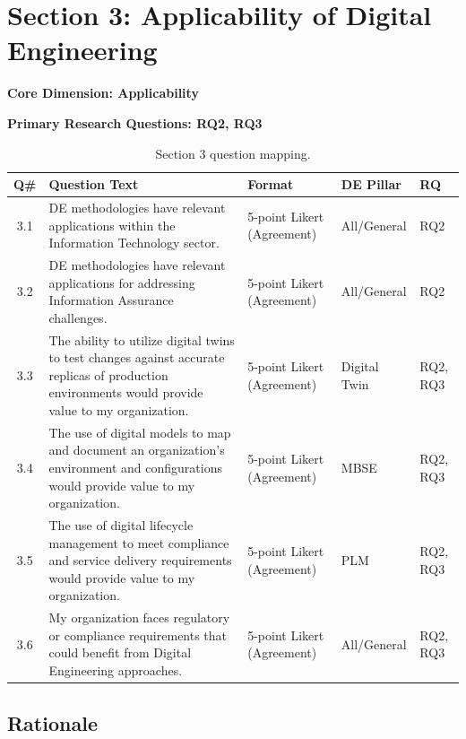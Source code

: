   \section{Section 3: Applicability of Digital Engineering}

  \textbf{Core Dimension: Applicability}

  \textbf{Primary Research Questions: RQ2, RQ3}

  \begin{table}[H]
    \centering
    \caption{Section 3 question mapping.}
    \label{tab:section3-mapping}
    \small
    \begin{tabular}{@{}cp{2.2in}p{0.9in}p{0.8in}l@{}}
      \toprule
      \textbf{Q\#} & \textbf{Question Text} & \textbf{Format} & \textbf{DE Pillar} & \textbf{RQ} \\
      \midrule
      3.1 & DE methodologies have relevant applications within the Information Technology sector. & 5-point Likert (Agreement) & All/General & RQ2 \\
      3.2 & DE methodologies have relevant applications for addressing Information Assurance challenges. & 5-point Likert (Agreement) & All/General & RQ2 \\
      3.3 & The ability to utilize digital twins to test changes against accurate replicas of production environments would provide value to my organization. & 5-point Likert (Agreement) & Digital Twin & RQ2, RQ3 \\
      3.4 & The use of digital models to map and document an organization's environment and configurations would provide value to my organization. & 5-point Likert (Agreement) & MBSE & RQ2, RQ3 \\
      3.5 & The use of digital lifecycle management to meet compliance and service delivery requirements would provide value to my organization. & 5-point Likert (Agreement) & PLM & RQ2, RQ3 \\
      3.6 & My organization faces regulatory or compliance requirements that could benefit from Digital Engineering approaches. & 5-point Likert (Agreement) & All/General & RQ2, RQ3 \\
      \bottomrule
    \end{tabular}
  \end{table}

  \subsection{Rationale}

